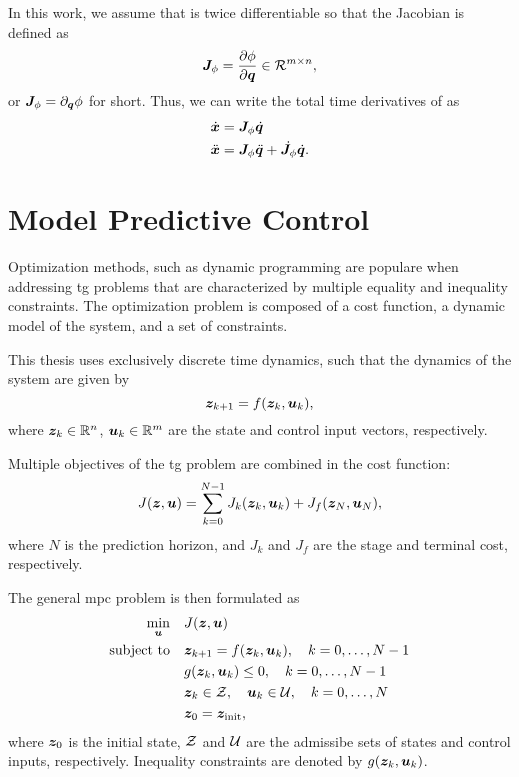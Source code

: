 In this work, we assume that \map{} is twice
differentiable so that the Jacobian is defined as
\begin{equation}
  \bm{J}_{\phi} = \frac{\partial\phi}{\partial\bm{q}} \in \mathcal{R}^{m\times n}, 
\end{equation}
or $\bm{J}_{\phi} = \partial_{\bm{q}}\phi$ for short.
Thus, we can write the total time derivatives of \x{} as
\begin{align}
  \dot{\bm{x}} &= \bm{J}_{\phi}\dot{\bm{q}} \\
  \ddot{\bm{x}} &= \bm{J}_{\phi}\ddot{\bm{q}} + \dot{\bm{J}}_{\phi}\dot{\bm{q}}.
\end{align}


\section{Model Predictive Control} %
\label{sec:model_predictive_control}

Optimization methods, such as dynamic programming are
populare when addressing \ac{tg} problems that are
characterized by multiple equality and inequality
constraints. 
The optimization problem is composed of a cost function, 
a dynamic model of the system, and a set of constraints.

This thesis uses exclusively discrete time dynamics, such
that the dynamics of the system are given by 
\begin{equation}
  \bm{z}_{k+1} = f(\bm{z}_k, \bm{u}_k),
\end{equation}
where $\bm{z}_k \in \mathbb{R}^n$, $\bm{u}_k \in \mathbb{R}^m$ are the state and
control input vectors, respectively. 

Multiple objectives of the \ac{tg} problem are combined in
the cost function:
\begin{equation}
  J(\bm{z},\bm{u}) = \sum_{k=0}^{N-1} J_k(\bm{z}_k, \bm{u}_k) + J_f(\bm{z}_N,\bm{u}_N),
\end{equation}
where $N$ is the prediction horizon, and $J_k$ and $J_f$ are
the stage and terminal cost, respectively.

The general \ac{mpc} problem is then formulated as
\begin{equation}
  \begin{aligned}
    \min_{\bm{u}} \quad & J(\bm{z},\bm{u}) \\
    \text{subject to} \quad & \bm{z}_{k+1} = f(\bm{z}_k, \bm{u}_k), \quad k=0,\ldots,N-1 \\
    & g(\bm{z}_k, \bm{u}_k) \leq 0, \quad k=0,\ldots,N-1 \\
    & \bm{z}_k \in \mathcal{Z}, \quad \bm{u}_k \in \mathcal{U}, \quad k=0,\ldots,N \\
    & \bm{z}_0 = \bm{z}_{\textrm{init}},
  \end{aligned}
\end{equation}
where $\bm{z}_0$ is the initial state, $\mathcal{Z}$ and $\mathcal{U}$ are the
admissibe sets of states and control inputs, respectively.
Inequality constraints are denoted by $g(\bm{z}_k, \bm{u}_k)$.

